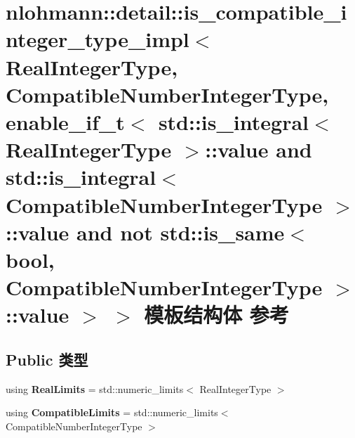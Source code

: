 \hypertarget{structnlohmann_1_1detail_1_1is__compatible__integer__type__impl_3_01_real_integer_type_00_01_com5aa74bcf254245a639da00509f4d2655}{}\section{nlohmann\+::detail\+::is\+\_\+compatible\+\_\+integer\+\_\+type\+\_\+impl$<$ Real\+Integer\+Type, Compatible\+Number\+Integer\+Type, enable\+\_\+if\+\_\+t$<$ std\+::is\+\_\+integral$<$ Real\+Integer\+Type $>$\+::value and std\+::is\+\_\+integral$<$ Compatible\+Number\+Integer\+Type $>$\+::value and not std\+::is\+\_\+same$<$ bool, Compatible\+Number\+Integer\+Type $>$\+::value $>$ $>$ 模板结构体 参考}
\label{structnlohmann_1_1detail_1_1is__compatible__integer__type__impl_3_01_real_integer_type_00_01_com5aa74bcf254245a639da00509f4d2655}
\subsection*{Public 类型}
\begin{DoxyCompactItemize}
\item 
\mbox{\label{structnlohmann_1_1detail_1_1is__compatible__integer__type__impl_3_01_real_integer_type_00_01_com5aa74bcf254245a639da00509f4d2655_a0e9f2586c4de25750563770c9388ab9f}} 
using {\bfseries Real\+Limits} = std\+::numeric\+\_\+limits$<$ Real\+Integer\+Type $>$
\item 
\mbox{\label{structnlohmann_1_1detail_1_1is__compatible__integer__type__impl_3_01_real_integer_type_00_01_com5aa74bcf254245a639da00509f4d2655_a002983b5c7c0f72b89d2151a6b39627d}} 
using {\bfseries Compatible\+Limits} = std\+::numeric\+\_\+limits$<$ Compatible\+Number\+Integer\+Type $>$
\end{DoxyCompactItemize}
